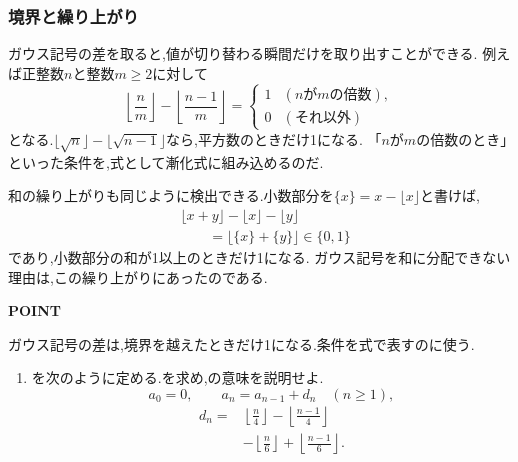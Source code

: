 \subsubsection{境界と繰り上がり}\label{節：境界と繰り上がり}
ガウス記号の差を取ると,値が切り替わる瞬間だけを取り出すことができる.
例えば正整数$n$と整数$m\ge2$に対して
\[
  \left\lfloor\frac nm\right\rfloor-
  \left\lfloor\frac{n-1}{m}\right\rfloor
  =\begin{cases}
    1 & (n\text{が}m\text{の倍数}),\\
    0 & (\text{それ以外})
  \end{cases}
\]
となる.$\lfloor\sqrt n\rfloor-\lfloor\sqrt{n-1}\rfloor$なら,平方数のときだけ1になる.
「$n$が$m$の倍数のとき」といった条件を,式として漸化式に組み込めるのだ.

和の繰り上がりも同じように検出できる.小数部分を$\{x\}=x-\lfloor x\rfloor$と書けば,
\begin{align*}
  &\lfloor x+y\rfloor-\lfloor x\rfloor-\lfloor y\rfloor\\
  &\qquad=\lfloor\{x\}+\{y\}\rfloor\in\{0,1\}
\end{align*}
であり,小数部分の和が1以上のときだけ1になる.
ガウス記号を和に分配できない理由は,この繰り上がりにあったのである.

\begin{bookpoint}
  \textbf{POINT}\par
  ガウス記号の差は,境界を越えたときだけ1になる.条件を式で表すのに使う.
\end{bookpoint}

\noindent {}\par\nobreak
\begin{enumerate}[label=(\arabic*),parsep=3pt,beginpenalty=10000,format=\bookitemlink{example-gauss-role-4}{problem}{answer}]
  \item {}を次のように定める.を求め,の意味を説明せよ.
    \[
      a_0=0,\qquad a_n=a_{n-1}+d_n\quad(n\ge1),
    \]
    \[
      \begin{aligned}
        d_n={}&\left\lfloor\frac n4\right\rfloor
        -\left\lfloor\frac{n-1}{4}\right\rfloor\\
        &-\left\lfloor\frac n6\right\rfloor
        +\left\lfloor\frac{n-1}{6}\right\rfloor.
      \end{aligned}
    \]
\end{enumerate}

